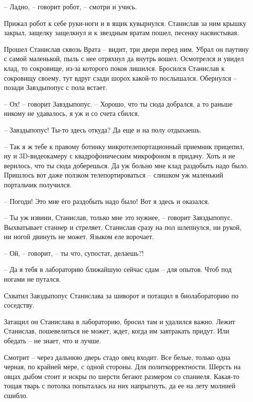 \documentclass[ebook,oneside,final,openright]{memoir}
\begin{document}
– Ладно, – говорит робот, – смотри и учись. \par
Прижал робот к себе руки-ноги и в ящик кувырнулся. Станислав за ним крышку закрыл, защелку защелкнул и к звездным вратам пошел, песенку насвистывая.\par
\par
Прошел Станислав сквозь Врата – видит, три двери перед ним. Убрал он паутину с самой маленькой, пыль с нее отряхнул да внутрь вошел. Осмотрелся и увидел клад, то сокровище, из-за которого покоя лишился. Бросился Станислав к сокровищу своему, тут вдруг сзади шорох какой-то послышался. Обернулся – позади Завздыпопус с пола встает.\par
– Ох! – говорит Завздыпопус. – Хорошо, что ты сюда добрался, а то раньше никому не удавалось, я уж и со счета сбился.\par
– Завздыпопус! Ты-то здесь откуда? Да еще и на полу отдыхаешь.\par
– Так я ж тебе к правому ботинку микротелепортационный приемник прицепил, ну и 3D-видеокамеру с квадрофоническим микрофоном в придачу. Хоть и не верилось, что ты сюда доберешься. Да уж больно мне клад раздобыть надо было. Пришлось вот даже ползком телепортироваться – слишком уж маленький портальчик получился.\par
– Погоди! Это мне его раздобыть надо было! Вот я здесь и оказался.\par
– Ты уж извини, Станислав, только мне это нужнее, – говорит Завздыпопус. Выхватывает станнер и стреляет. Станислав сразу на пол шлепнулся, ни рукой, ни ногой двинуть не может. Языком еле ворочает.\par
– Ой, – говорит, – ты что, супостат, делаешь?!\par
– Да я тебя в лабораторию ближайшую сейчас сдам – для опытов. Чтоб под ногами не путался.\par
Схватил Завздыпопус Станислава за шиворот и потащил в биолабораторию по соседству.\par
\par
Затащил он Станислава в лабораторию, бросил там и удалился важно. Лежит Станислав, пошевелиться не может, ждет, когда им завтракать придут. Или обедать – не знает, что и лучше. \par
Смотрит – через дальнюю дверь стадо овец входит. Все белые, только одна черная, по крайней мере, с одной стороны. Для политкорректности. Шерсть на овцах дыбом стоит и искры по шерсти бегают размером со спаниеля. Какая-то тощая тварь с потолка попыталась на них напрыгнуть, да ее на лету молнией сшибло.\par
\end{document}
